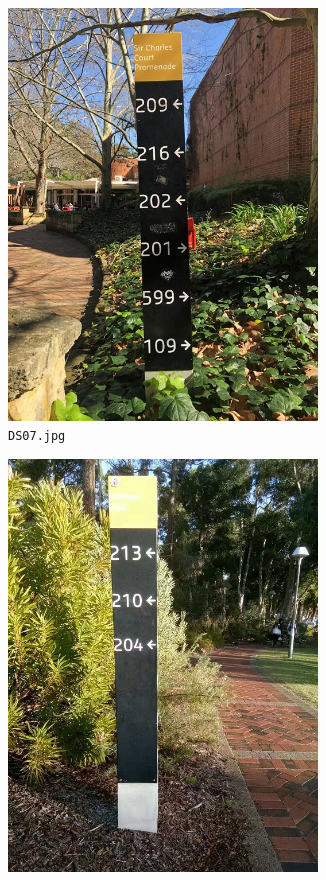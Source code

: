 \documentclass{article}
\begin{document}
\begin{figure}[h]
\begin{subfigure}[t]{0.22\textwidth}
    \includegraphics[width=0.9\textwidth]{../train/task2/DS07}
    \caption[DS07]{
      \lstinline{DS07.jpg}
    }
    \label{fig:ds07}
  \end{subfigure}
  \begin{subfigure}[t]{0.22\textwidth}
    \centering
    \includegraphics[width=0.9\textwidth]{../train/task2/DS10}

\end{subfigure}
\end{figure}
\end{document}
